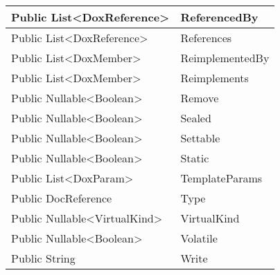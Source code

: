 \documentclass[11pt, oneside, a4paper]{book}
\begin{document}
\begin{center}
\begin{tabular}{| p{3cm} | p{12cm} | }
\hline
 Public  List<DoxReference> &  ReferencedBy\hypertarget{SoftwareEngineeringTools.{}Documentation.{}DoxProperty.{}ReferencedBy}{}\\
\hline
 Public  List<DoxReference> &  References\hypertarget{SoftwareEngineeringTools.{}Documentation.{}DoxProperty.{}References}{}\\
\hline
 Public  List<DoxMember> &  ReimplementedBy\hypertarget{SoftwareEngineeringTools.{}Documentation.{}DoxProperty.{}ReimplementedBy}{}\\
\hline
 Public  List<DoxMember> &  Reimplements\hypertarget{SoftwareEngineeringTools.{}Documentation.{}DoxProperty.{}Reimplements}{}\\
\hline
 Public  Nullable<Boolean> &  Remove\hypertarget{SoftwareEngineeringTools.{}Documentation.{}DoxProperty.{}Remove}{}\\
\hline
 Public  Nullable<Boolean> &  Sealed\hypertarget{SoftwareEngineeringTools.{}Documentation.{}DoxProperty.{}Sealed}{}\\
\hline
 Public  Nullable<Boolean> &  Settable\hypertarget{SoftwareEngineeringTools.{}Documentation.{}DoxProperty.{}Settable}{}\\
\hline
 Public  Nullable<Boolean> &  Static\hypertarget{SoftwareEngineeringTools.{}Documentation.{}DoxProperty.{}Static}{}\\
\hline
 Public  List<DoxParam> &  TemplateParams\hypertarget{SoftwareEngineeringTools.{}Documentation.{}DoxProperty.{}TemplateParams}{}\\
\hline
 Public  DocReference &  Type\hypertarget{SoftwareEngineeringTools.{}Documentation.{}DoxProperty.{}Type}{}\\
\hline
 Public  Nullable<VirtualKind> &  VirtualKind\hypertarget{SoftwareEngineeringTools.{}Documentation.{}DoxProperty.{}VirtualKind}{}\\
\hline
 Public  Nullable<Boolean> &  Volatile\hypertarget{SoftwareEngineeringTools.{}Documentation.{}DoxProperty.{}Volatile}{}\\
\hline
 Public  String &  Write\hypertarget{SoftwareEngineeringTools.{}Documentation.{}DoxProperty.{}Write}{}\\
\hline
\end{tabular}
\end{center}
\end{document}
